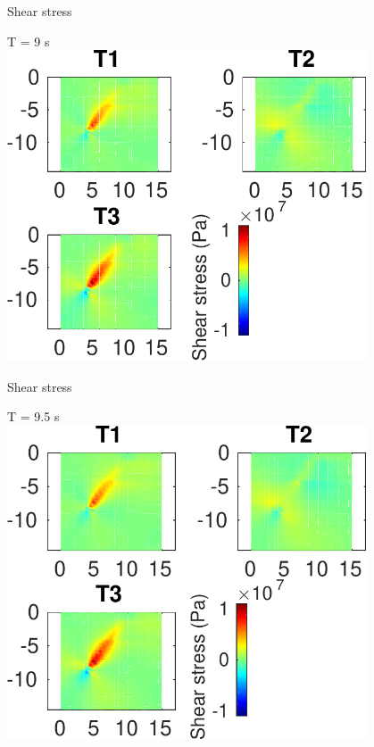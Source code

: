 \documentclass{beamer}
\begin{document}
\begin{frame}
 {Shear stress}
 
 \centering \Large T = 9 s\\
 \includegraphics[width=0.8\textwidth]{images/vertical_00096}
 
\end{frame}

\begin{frame}
 {Shear stress}
 
 \centering \Large T = 9.5 s\\
 \includegraphics[width=0.8\textwidth]{images/vertical_00101}
 
\end{frame}
\end{document}
